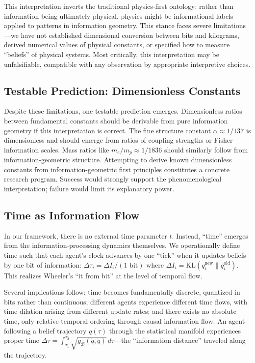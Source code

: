 \documentclass[11pt]{article}
\begin{document}
This interpretation inverts the traditional physics-first ontology: rather than information being ultimately physical, physics might be informational labels applied to patterns in information geometry. This stance faces severe limitations---we have not established dimensional conversion between bits and kilograms, derived numerical values of physical constants, or specified how to measure ``beliefs'' of physical systems. Most critically, this interpretation may be unfalsifiable, compatible with any observation by appropriate interpretive choices.

\subsection{Testable Prediction: Dimensionless Constants}

Despite these limitations, one testable prediction emerges. Dimensionless ratios between fundamental constants should be derivable from pure information geometry if this interpretation is correct. The fine structure constant $\alpha \approx 1/137$ is dimensionless and should emerge from ratios of coupling strengths or Fisher information scales. Mass ratios like $m_e/m_p \approx 1/1836$ should similarly follow from information-geometric structure. Attempting to derive known dimensionless constants from information-geometric first principles constitutes a concrete research program. Success would strongly support the phenomenological interpretation; failure would limit its explanatory power.

\subsection{Time as Information Flow}

In our framework, there is no external time parameter $t$. Instead, ``time'' emerges from the information-processing dynamics themselves. We operationally define time such that each agent's clock advances by one ``tick'' when it updates beliefs by one bit of information: $\Delta \tau_i = \Delta I_i / (1 \text{ bit})$ where $\Delta I_i = \mathrm{KL}(q_i^{\text{new}} \| q_i^{\text{old}})$. This realizes Wheeler's ``it from bit'' at the level of temporal flow.

Several implications follow: time becomes fundamentally discrete, quantized in bits rather than continuous; different agents experience different time flows, with time dilation arising from different update rates; and there exists no absolute time, only relative temporal ordering through causal information flow. An agent following a belief trajectory $q(\tau)$ through the statistical manifold experiences proper time $\Delta \tau = \int_{\tau_1}^{\tau_2} \sqrt{g_{\mathcal{B}}(\dot{q}, \dot{q})} \, d\tau$---the ``information distance'' traveled along the trajectory.
\end{document}
